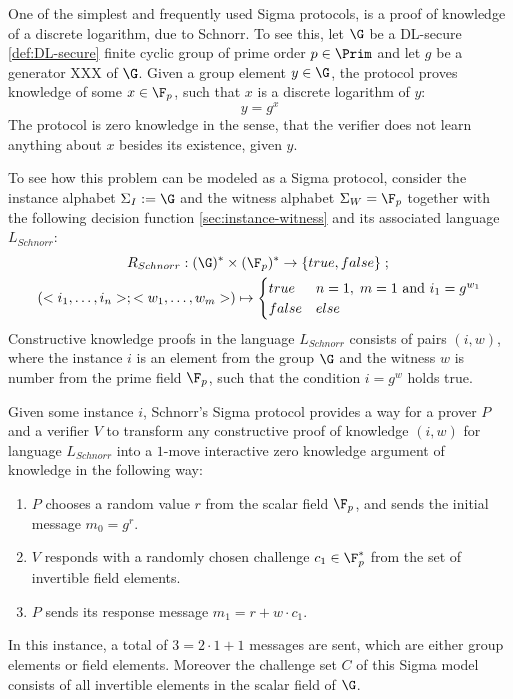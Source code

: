 \begin{example}
\label{ex:interactive-Schnorr}
One of the simplest and frequently used Sigma protocols, is a proof of knowledge of a discrete logarithm,  due to Schnorr. To see this, let $\G$ be a DL-secure \ref{def:DL-secure} finite cyclic group of prime order $p\in\Prim$ and let $g$ be a generator XXX of $\G$. Given a group element $y\in \G$, the protocol proves knowledge of some $x \in \F_p$, such that $x$ is a discrete logarithm of $y$:
$$
y = g^x
$$
The protocol is zero knowledge in the sense, that the verifier does not learn anything about $x$ besides its existence, given $y$.

To see how this problem can be modeled as a Sigma protocol, consider the instance alphabet $\Sigma_I:=\G$ and the witness alphabet $\Sigma_W= \F_p$ together with the following decision function \ref{sec:instance-witness} and its associated language $L_{Schnorr}$:
\begin{multline*}
R_{Schnorr} : (\G)^* \times (\F_p)^* \to \{true, false\}\;;\;\\
(<i_1,\ldots,i_n>;<w_1,\ldots, w_m>) \mapsto
\begin{cases}
true & n=1,\; m=1 \text{ and } i_1 = g^{w_1}\\
false & else
\end{cases}
\end{multline*}
Constructive knowledge proofs in the language $L_{Schnorr}$ consists of pairs $(i,w)$, where the instance $i$ is an element from the group $\G$ and the witness $w$ is number from the prime field $\F_p$, such that the condition $i=g^w$ holds true.

Given some instance $i$, Schnorr's Sigma protocol provides a way for a prover $P$ and a verifier $V$ to transform any constructive proof of knowledge $(i,w)$ for language $L_{Schnorr}$ into a $1$-move interactive zero knowledge argument of knowledge in the following way:
\begin{enumerate}
\item $P$ chooses a random value $r$ from the scalar field $\F_p$, and sends the initial message $m_0=g^r$. 
\item $V$ responds with a randomly chosen challenge $c_1\in \F^*_p$ from the set of invertible field elements.
\item $P$ sends its response message $m_1=r+w\cdot c_1$.
\end{enumerate}
In this instance, a total of $3=2\cdot 1 + 1$ messages are sent, which are either group elements or field elements. Moreover the challenge set $C$ of this Sigma model consists of all invertible elements in the scalar field of $\G$.


\end{example}
